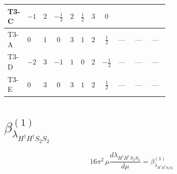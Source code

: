 \documentclass[8pt]{article}
\begin{document}
\begin{landscape}
\begin{longtable}{@{}llcccccc >{\raggedright\arraybackslash}p{0.21\linewidth} >{\raggedright\arraybackslash}p{0.21\linewidth} >{\raggedright\arraybackslash}p{0.21\linewidth}@{}}
\midrule
T3-C & $-1$ & $2$ & $-\frac{1}{2}$ & $2$ & $\frac{1}{2}$ & $3$ & $0$ & \scriptsize\adjustbox{max width=\linewidth}{$\begin{gathered} +{\lambda_{H2}} (4 {\lambda_{H H^\dagger S_1^\dagger S_2^\dagger}^{\rm Cross}}+3 {\lambda_{S_1^\dagger S_2 S_2^{\dagger 2}}})\end{gathered}$} & \scriptsize\adjustbox{max width=\linewidth}{$\begin{gathered} +{\lambda_{H2}^{\rm Adj}} \left(-\frac{3 {\lambda_{H H^\dagger S_1^\dagger S_2^\dagger}^{\rm Cross}}}{2}-\frac{3 {\lambda_{S_1^\dagger S_2 S_2^{\dagger 2}}}}{4}\right)\end{gathered}$} & \scriptsize\adjustbox{max width=\linewidth}{$\begin{gathered} -6 {\lambda_{H^\dagger H^\dagger S_1^\dagger S_1^\dagger}} {\lambda_{T3}}\end{gathered}$} \\
\midrule
T3-A & $0$ & $1$ & $0$ & $3$ & $1$ & $2$ & $\frac{1}{2}$ & --- & --- & --- \\
\midrule
T3-D & $-2$ & $3$ & $-1$ & $1$ & $0$ & $2$ & $-\frac{1}{2}$ & --- & --- & --- \\
\midrule
T3-E & $0$ & $3$ & $0$ & $3$ & $1$ & $2$ & $\frac{1}{2}$ & --- & --- & --- \\
\midrule
\bottomrule
\end{longtable}
\clearpage
\section*{$\beta_{\lambda_{H^\dagger H^\dagger S_2 S_2}}^{(1)}$}
\[16\pi^2\,\mu\frac{d \lambda_{H^\dagger H^\dagger S_2 S_2}}{d\mu}=\beta_{\lambda_{H^\dagger H^\dagger S_2 S_2}}^{(1)}\]

\end{landscape}
\end{document}
